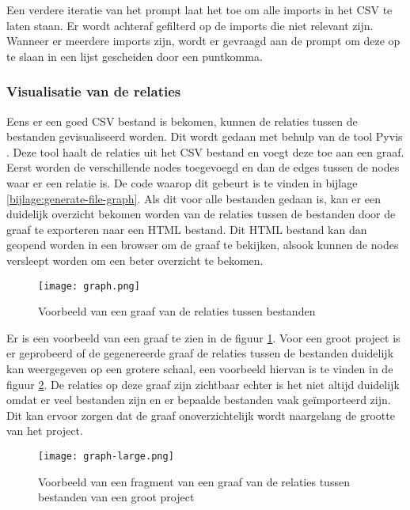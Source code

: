 Een verdere iteratie van het prompt laat het toe om alle imports in het CSV te laten staan. 
Er wordt achteraf gefilterd op de imports die niet relevant zijn. 
Wanneer er meerdere imports zijn, wordt er gevraagd aan de prompt om deze op te slaan in een lijst gescheiden door een puntkomma.

\subsubsection{Visualisatie van de relaties}
\label{subsec:project-documentatie-relaties-visualisatie}

Eens er een goed CSV bestand is bekomen, kunnen de relaties tussen de bestanden gevisualiseerd worden.
Dit wordt gedaan met behulp van de tool Pyvis \autocite{WHIR2018}.
Deze tool haalt de relaties uit het CSV bestand en voegt deze toe aan een graaf. 
Eerst worden de verschillende nodes toegevoegd en dan de edges tussen de nodes waar er een relatie is. 
De code waarop dit gebeurt is te vinden in bijlage \ref{bijlage:generate-file-graph}.
Als dit voor alle bestanden gedaan is, kan er een duidelijk overzicht bekomen worden van de relaties tussen de bestanden door de graaf te exporteren naar een HTML bestand.
Dit HTML bestand kan dan geopend worden in een browser om de graaf te bekijken, alsook kunnen de nodes versleept worden om een beter overzicht te bekomen.

\begin{figure}[h]
    \centering
    \texttt{[image: graph.png]}
    \caption{Voorbeeld van een graaf van de relaties tussen bestanden}
    \label{fig:graph}
\end{figure}

Er is een voorbeeld van een graaf te zien in de figuur \ref{fig:graph}. 
Voor een groot project is er geprobeerd of de gegenereerde graaf de relaties tussen de bestanden duidelijk kan weergegeven op een grotere schaal, een voorbeeld hiervan is te vinden in de figuur \ref{fig:graph-large}.
De relaties op deze graaf zijn zichtbaar echter is het niet altijd duidelijk omdat er veel bestanden zijn en er bepaalde bestanden vaak geïmporteerd zijn.
Dit kan ervoor zorgen dat de graaf onoverzichtelijk wordt naargelang de grootte van het project.

\begin{figure}[h]
    \centering
    \texttt{[image: graph-large.png]}
    \caption{Voorbeeld van een fragment van een graaf van de relaties tussen bestanden van een groot project}
    \label{fig:graph-large}
\end{figure}

